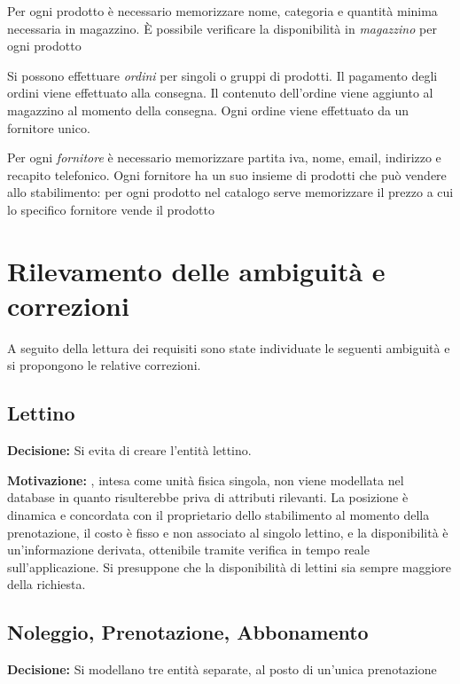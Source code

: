 \begin{tcolorbox}[breakable, colback=lightgray, colframe=primary!40, left=8pt, right=8pt,
                  top=6pt, bottom=6pt]
Per ogni prodotto è necessario memorizzare nome, categoria e quantità minima necessaria 
in magazzino. È possibile verificare la disponibilità in \textit{magazzino} per ogni prodotto

Si possono effettuare \textit{ordini} per singoli o gruppi di prodotti. Il pagamento 
degli ordini viene effettuato alla consegna. Il contenuto dell'ordine viene aggiunto al magazzino 
al momento della consegna. Ogni ordine viene effettuato da un fornitore unico.

Per ogni \textit{fornitore} è necessario memorizzare partita iva, nome, email, indirizzo 
e recapito telefonico. Ogni fornitore ha un suo insieme di prodotti che può vendere allo stabilimento: 
per ogni prodotto nel catalogo serve memorizzare il prezzo a cui lo specifico fornitore vende il prodotto

\end{tcolorbox}

\clearpage
\section{Rilevamento delle ambiguità e correzioni}

A seguito della lettura dei requisiti sono state individuate le seguenti ambiguità
e si propongono le relative correzioni.

\subsection{Lettino}\label{sec:lettino}
\textbf{Decisione:} Si evita di creare l'entit\`{a} lettino.

\textbf{Motivazione:} , intesa come unità fisica singola, non viene 
modellata nel database in quanto risulterebbe  priva di attributi rilevanti. 
La posizione è dinamica e concordata con il proprietario dello stabilimento 
al momento della prenotazione, il costo è fisso e non associato al singolo lettino, e la 
disponibilità è un'informazione derivata, ottenibile tramite verifica in tempo reale 
sull'applicazione. Si presuppone che la disponibilità di lettini sia sempre maggiore della richiesta.

\subsection{Noleggio, Prenotazione, Abbonamento}
\textbf{Decisione:} Si modellano tre entit\`{a} separate, al posto di un'unica prenotazione 


